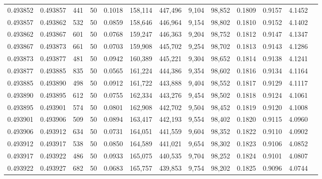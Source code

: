 \begin{tabular}{rrrrrrrrrrrrr}
0.493852 & 0.493857 &   441 &  50 &                                     0.1018 & 158,114 & 447,496 &   9,104 &  98,852 & 0.1809 & 0.9157 & 4.1452 \\
0.493857 & 0.493862 &   532 &  50 &                                     0.0859 & 158,646 & 446,964 &   9,154 &  98,802 & 0.1810 & 0.9152 & 4.1402 \\
0.493862 & 0.493867 &   601 &  50 &                                     0.0768 & 159,247 & 446,363 &   9,204 &  98,752 & 0.1812 & 0.9147 & 4.1347 \\
0.493867 & 0.493873 &   661 &  50 &                                     0.0703 & 159,908 & 445,702 &   9,254 &  98,702 & 0.1813 & 0.9143 & 4.1286 \\
0.493873 & 0.493877 &   481 &  50 &                                     0.0942 & 160,389 & 445,221 &   9,304 &  98,652 & 0.1814 & 0.9138 & 4.1241 \\
0.493877 & 0.493885 &   835 &  50 &                                     0.0565 & 161,224 & 444,386 &   9,354 &  98,602 & 0.1816 & 0.9134 & 4.1164 \\
0.493885 & 0.493890 &   498 &  50 &                                     0.0912 & 161,722 & 443,888 &   9,404 &  98,552 & 0.1817 & 0.9129 & 4.1117 \\
0.493890 & 0.493895 &   612 &  50 &                                     0.0755 & 162,334 & 443,276 &   9,454 &  98,502 & 0.1818 & 0.9124 & 4.1061 \\
0.493895 & 0.493901 &   574 &  50 &                                     0.0801 & 162,908 & 442,702 &   9,504 &  98,452 & 0.1819 & 0.9120 & 4.1008 \\
0.493901 & 0.493906 &   509 &  50 &                                     0.0894 & 163,417 & 442,193 &   9,554 &  98,402 & 0.1820 & 0.9115 & 4.0960 \\
0.493906 & 0.493912 &   634 &  50 &                                     0.0731 & 164,051 & 441,559 &   9,604 &  98,352 & 0.1822 & 0.9110 & 4.0902 \\
0.493912 & 0.493917 &   538 &  50 &                                     0.0850 & 164,589 & 441,021 &   9,654 &  98,302 & 0.1823 & 0.9106 & 4.0852 \\
0.493917 & 0.493922 &   486 &  50 &                                     0.0933 & 165,075 & 440,535 &   9,704 &  98,252 & 0.1824 & 0.9101 & 4.0807 \\
0.493922 & 0.493927 &   682 &  50 &                                     0.0683 & 165,757 & 439,853 &   9,754 &  98,202 & 0.1825 & 0.9096 & 4.0744 \\

\end{tabular}
